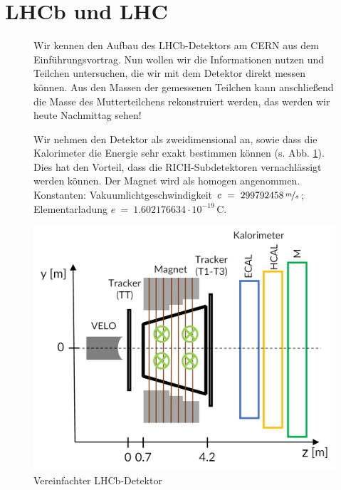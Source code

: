 \section*{LHCb und LHC}
\begin{figure}[h]
     \begin{minipage}[t]{0.6\textwidth}
      \vspace{-6cm} Wir kennen den Aufbau des LHCb-Detektors am CERN aus dem Einführungsvortrag. Nun wollen wir die Informationen nutzen und Teilchen untersuchen, die wir mit dem Detektor direkt messen können. Aus den Massen der gemessenen Teilchen kann anschließend die Masse des Mutterteilchens rekonstruiert werden, das werden wir heute Nachmittag sehen! 
      
      Wir nehmen den Detektor als zweidimensional an, sowie dass die Kalorimeter die Energie sehr exakt bestimmen können (s. Abb. \ref{fig: Der Detektor}). Dies hat den Vorteil, dass die RICH-Subdetektoren vernachlässigt werden können. Der Magnet wird als homogen angenommen. Konstanten: Vakuumlichtgeschwindigkeit $c~=~ 299792458 \, \nicefrac{m}{s}$; Elementarladung $e~=~ 1.602176634\cdot10^{-19}$\,C.  \end{minipage}
            \begin{minipage}[t]{0.4\textwidth}
            \centering
            \includegraphics[width=\textwidth]{Figures Worksheets/LHCb_Calculation_LHCb_Detector_DE.png} 
            \caption{Vereinfachter LHCb-Detektor} \label{fig: Der Detektor}
            \end{minipage}
            \end{figure}
